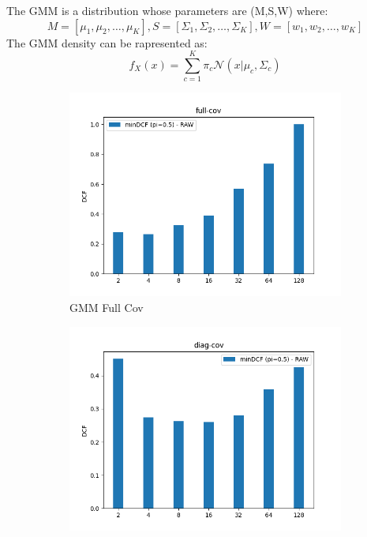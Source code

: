 \documentclass[english]{report}
\begin{document}
The GMM is a distribution whose parameters are (M,S,W) where:
\[M = [\mu_1, \mu_2, \dots, \mu_K], S = [\Sigma_1, \Sigma_2, \dots, \Sigma_K],
W = [w_1, w_2, \dots, w_K]\]
The GMM density can be rapresented as:
\[f_X(x) = \sum_{c=1}^{K}\pi_c\mathcal{N} (x|\mu_c,\Sigma_c)\]

\begin{figure}[h!]
    \begin{subfigure}{0.4\textwidth}
        \includegraphics[scale=0.4]{../../images/validation/GMM_full-cov_component_comparison}
        \caption{GMM Full Cov}
    \end{subfigure}
    \begin{subfigure}{0.4\textwidth}
        \includegraphics[scale=0.4]{../../images/validation/GMM_diag-cov_component_comparison}

\end{subfigure}
\end{figure}
\end{document}

